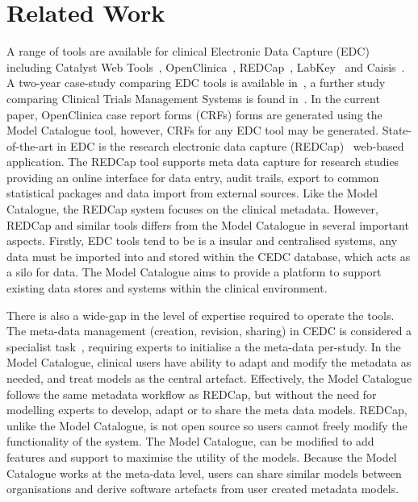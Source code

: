 
\section{Related Work}

A range of tools are available for clinical Electronic Data Capture (EDC) including Catalyst Web Tools~\cite{catalyst}, OpenClinica~\cite{oc}, REDCap~\cite{harr09}, LabKey~\cite{labk} and Caisis~\cite{cais}. A two-year case-study comparing EDC tools is available in~\cite{fran11}, a further study comparing Clinical Trials Management Systems is found in~\cite{lero11}. In the current paper, OpenClinica case report forms (CRFs) forms are generated using the Model Catalogue tool, however, CRFs for any EDC tool may be generated. State-of-the-art in EDC is the research electronic data capture (REDCap)~\cite{harr09} web-based application. The REDCap tool supports meta data capture for research studies providing an online interface for data entry, audit trails, export to common statistical packages and data import from external sources. Like the Model Catalogue, the REDCap system focuses on the clinical metadata. However, REDCap and similar tools differs from the Model Catalogue in several important aspects. Firstly, EDC tools tend to be is a insular and centralised systems, any data must be imported into and stored within the CEDC database, which acts as a silo for data. The Model Catalogue aims to provide a platform to support existing data stores and systems within the clinical environment. 

There is also a wide-gap in the level of expertise required to operate the tools. The meta-data management (creation, revision, sharing) in CEDC is considered a specialist task~\cite{harr09,fran11}, requiring experts to initialise a the meta-data per-study. In the Model Catalogue, clinical users have ability to adapt and modify the metadata as needed, and treat models as the central artefact. Effectively, the Model Catalogue follows the same metadata workflow as REDCap, but without the need for modelling experts to develop, adapt or to share the meta data models. REDCap, unlike the Model Catalogue, is not open source so users cannot freely modify the functionality of the system. The Model Catalogue, can be modified to add features and support to maximise the utility of the models. Because the Model Catalogue works at the meta-data level, users can share similar models between organisations and derive software artefacts from user created metadata models.

